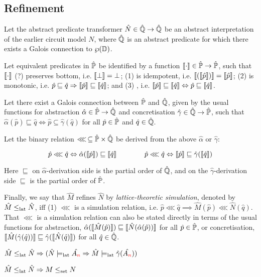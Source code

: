 \subsection{Refinement}

Let the abstract predicate transformer $\hat N \in \hat{\mathbb{Q}} \rightarrow \hat{\mathbb{Q}}$ be an abstract interpretation of the earlier circuit model $N$, where $\hat{\mathbb{Q}}$ is an abstract predicate for which there exists a Galois connection to $\wp(\mathbb{D})$.

Let equivalent predicates in $\hat{\mathbb{P}}$ be identified by a function $\llbracket \cdot \rrbracket \in \hat{\mathbb{P}} \rightarrow \hat{\mathbb{P}}$, such that $\llbracket \cdot \rrbracket$ (?) preserves bottom, i.e. $\llbracket \bot \rrbracket = \bot$; (1) is idempotent, i.e. $\llbracket (\llbracket \hat p \rrbracket) \rrbracket = \llbracket \hat p \rrbracket$; (2) is monotonic, i.e. $\hat p \sqsubseteq \hat q \Rightarrow \llbracket \hat p \rrbracket \sqsubseteq \llbracket \hat q \rrbracket$; and (3) , i.e. $\llbracket \hat p \rrbracket \sqsubseteq \llbracket \hat q \rrbracket \Leftrightarrow \hat p \sqsubseteq \llbracket \hat q \rrbracket$.

Let there exist a Galois connection between $\hat{\mathbb{P}}$ and $\hat{\mathbb{Q}}$, given by the usual functions for abstraction $\hat \alpha \in \hat{\mathbb{P}} \rightarrow \hat{\mathbb{Q}}$ and concretisation $\hat \gamma \in \hat{\mathbb{Q}} \rightarrow \hat{\mathbb{P}}$, such that $\hat \alpha(\hat p) \sqsubseteq \hat q \iff \hat p \subseteq \hat \gamma(\hat q)$ for all $\hat p \in \hat{\mathbb{P}}$ and $\hat q \in \hat{\mathbb{Q}}$.

Let the binary relation $\lll \, \subseteq \hat{\mathbb{P}} \times \hat{\mathbb{Q}}$ be derived from the above $\hat \alpha$ or $\hat \gamma$:

\begin{equation*}
\hat p \lll \hat q \Leftrightarrow \hat \alpha(\llbracket \hat p \rrbracket) \sqsubseteq \llbracket \hat q \rrbracket \quad\quad\quad\quad \hat p \lll \hat q \Leftrightarrow \llbracket \hat p \rrbracket \sqsubseteq \hat \gamma(\llbracket \hat q \rrbracket)
\end{equation*}

\noindent Here $\sqsubseteq$ on $\hat \alpha$-derivation side is the partial order of $\hat{\mathbb{Q}}$, and on the $\hat \gamma$-derivation side $\sqsubseteq$ is the partial order of $\hat{\mathbb{P}}$.

Finally, we say that $\hat M$ refines $\hat N$ by \textit{lattice-theoretic simulation}, denoted by $\hat M \leq_{\textrm{lat}} \hat N$, iff (1) $\lll$ is a simulation relation, i.e. $\hat p \lll \hat q \implies \hat M(\hat p) \lll \hat N(\hat q)$. That $\lll$ is a simulation relation can also be stated directly in terms of the usual functions for abstraction, $\hat \alpha(\llbracket \hat M(\hat p) \rrbracket) \sqsubseteq \llbracket \hat N(\hat \alpha(\hat p)) \rrbracket$ for all $\hat p \in \hat{\mathbb{P}}$, or concretisation, $\llbracket \hat M(\hat \gamma(\hat q)) \rrbracket \sqsubseteq \hat \gamma(\llbracket \hat N(\hat q) \rrbracket)$ for all $\hat q \in \hat{\mathbb{Q}}$.

\begin{theorem} \label{thm:lat-refines}
$\hat M \leq_{\textrm{lat}} \hat N \Rightarrow (\hat N \models_{\textrm{lat}} \hat {A_{\textcolor{red}{n}}} \Rightarrow \hat M \models_{\textrm{lat}} \hat \gamma(\hat {A_{\textcolor{red}{n}}}))$
\end{theorem}

\begin{theorem} \label{thm:lat-imply-set}
$\hat M \leq_{\textrm{lat}} \hat N \Rightarrow M \leq_{\textrm{set}} N$
\end{theorem}
